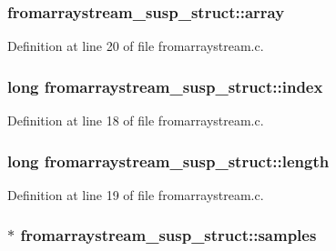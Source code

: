 \subsubsection[{\texorpdfstring{array}{array}}]{ fromarraystream\+\_\+susp\+\_\+struct\+::array}\hypertarget{structfromarraystream__susp__struct_a513040d7e80a6bf558c8de8aedfcacb1}{}\label{structfromarraystream__susp__struct_a513040d7e80a6bf558c8de8aedfcacb1}


Definition at line 20 of file fromarraystream.\+c.

\subsubsection[{\texorpdfstring{index}{index}}]{\setlength{\rightskip}{0pt plus 5cm}long fromarraystream\+\_\+susp\+\_\+struct\+::index}\hypertarget{structfromarraystream__susp__struct_a6571efd30efe75963d829e982b17c44d}{}\label{structfromarraystream__susp__struct_a6571efd30efe75963d829e982b17c44d}


Definition at line 18 of file fromarraystream.\+c.

\subsubsection[{\texorpdfstring{length}{length}}]{\setlength{\rightskip}{0pt plus 5cm}long fromarraystream\+\_\+susp\+\_\+struct\+::length}\hypertarget{structfromarraystream__susp__struct_a8062d1e8abfd3a51f5d58ad2fe9eb062}{}\label{structfromarraystream__susp__struct_a8062d1e8abfd3a51f5d58ad2fe9eb062}


Definition at line 19 of file fromarraystream.\+c.

\subsubsection[{\texorpdfstring{samples}{samples}}]{$\ast$ fromarraystream\+\_\+susp\+\_\+struct\+::samples}\hypertarget{structfromarraystream__susp__struct_ab243bcc37afdd3437eb0bb2098239862}{}\label{structfromarraystream__susp__struct_ab243bcc37afdd3437eb0bb2098239862}


